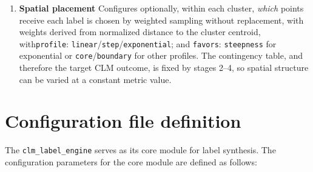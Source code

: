 \documentclass[a4paper,12pt]{article}
\begin{document}
\begin{enumerate}
    \item \textbf{Spatial placement} Configures optionally, within each cluster, \emph{which} points receive each label is chosen by weighted sampling without replacement, with weights derived from normalized distance to the cluster centroid, with\texttt{profile}: \texttt{linear}/\texttt{step}/\texttt{exponential}; and \texttt{favors}: \texttt{steepness} for exponential or \texttt{core}/\texttt{boundary} for other profiles. The contingency table, and therefore the target CLM outcome, is fixed by stages 2--4, so spatial structure can be varied at a constant metric value.

\end{enumerate}

\newpage

\section{Configuration file definition}
\noindent The \texttt{clm\_label\_engine} serves as its core module for label synthesis. The configuration parameters for the core module are defined as follows:
\end{document}
